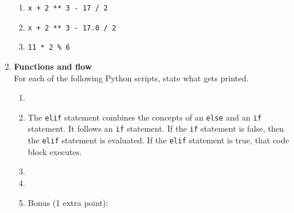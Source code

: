 \documentclass{article}
\begin{document}
\begin{enumerate}
\begin{enumerate}
\item \texttt{x + 2 ** 3 - 17 / 2}
\end{enumerate}

\begin{enumerate}
\setcounter{enumii}{1}
\item \texttt{x + 2 ** 3 - 17.0 / 2}
\end{enumerate}

\begin{enumerate}
\setcounter{enumii}{2}
\item \texttt{11 * 2 \% 6}
\end{enumerate}


\item \textbf{Functions and flow} \\
For each of the following Python scripts, state what gets printed.

\begin{enumerate}
\item 
\end{enumerate}

\begin{enumerate}
\setcounter{enumii}{1}
\item 
The \texttt{elif} statement combines the concepts of an \texttt{else} and an \texttt{if} statement.  It follows an \texttt{if} statement.  If the \texttt{if} statement is false, then the \texttt{elif} statement is evaluated.  If the \texttt{elif} statement is true, that code block executes.


\end{enumerate}

\begin{enumerate}
\setcounter{enumii}{2}
\item 
\end{enumerate}

\begin{enumerate}
\setcounter{enumii}{3}
\item 
\end{enumerate}

\begin{enumerate}
\setcounter{enumii}{4}
\item Bonus (1 extra point):


\end{enumerate}



\end{enumerate}
\end{document}
